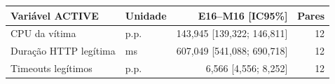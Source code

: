 \begin{tabular}{llrr}
\hline
Variável ACTIVE & Unidade & E16--M16 [IC95\%] & Pares \\
\hline
CPU da vítima & p.p. & 143,945 [139,322; 146,811] & 12 \\
Duração HTTP legítima & ms & 607,049 [541,088; 690,718] & 12 \\
Timeouts legítimos & p.p. & 6,566 [4,556; 8,252] & 12 \\
\hline
\end{tabular}
